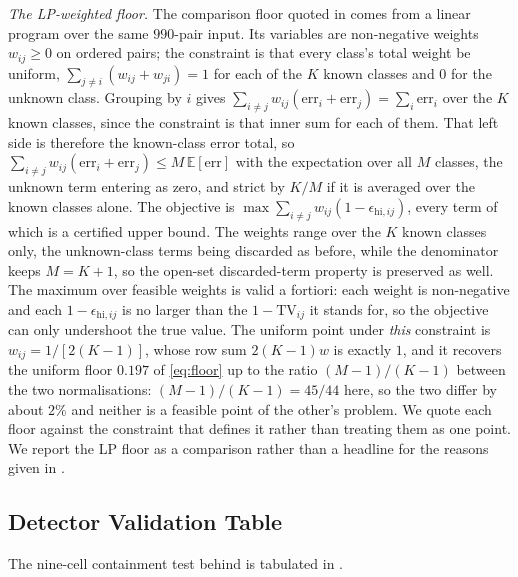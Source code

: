 \documentclass[sigconf,anonymous,review]{acmart}
\newcommand{\tv}{\mathrm{TV}}
\begin{document}
\emph{The LP-weighted floor.} The comparison floor quoted in
 comes from a linear program over the same $990$-pair
input. Its variables are non-negative weights $w_{ij}\ge 0$ on ordered pairs;
the constraint is that every class's total weight be uniform,
$\sum_{j\ne i}(w_{ij}+w_{ji})=1$ for each of the $K$ known classes and $0$ for
the unknown class. Grouping by $i$ gives
$\sum_{i\ne j}w_{ij}(\mathrm{err}_i+\mathrm{err}_j)=\sum_i \mathrm{err}_i$ over the
$K$ known classes, since the constraint is that inner sum for each of them. That
left side is therefore the known-class error total, so
$\sum_{i\ne j}w_{ij}(\mathrm{err}_i+\mathrm{err}_j)\le M\,\mathbb{E}[\mathrm{err}]$
with the expectation over all $M$ classes, the unknown term entering as zero,
and strict by $K/M$ if it is averaged over the known classes alone. The objective is
$\max\sum_{i\ne j}w_{ij}(1-\epsilon_{\mathrm{hi},ij})$, every term of
which is a certified upper bound. The weights range over the $K$ known classes
only, the unknown-class terms being discarded as before, while the denominator
keeps $M = K+1$, so the open-set discarded-term property is preserved as well. The
maximum over feasible weights is valid a fortiori: each weight is non-negative
and each $1-\epsilon_{\mathrm{hi},ij}$ is no larger than the $1-\tv_{ij}$ it stands for,
so the objective can only undershoot the true value. The uniform point under
\emph{this} constraint is $w_{ij}=1/[2(K-1)]$, whose row sum $2(K-1)w$ is exactly
$1$, and it recovers the uniform floor $0.197$ of \eqref{eq:floor} up to the
ratio $(M-1)/(K-1)$ between the two normalisations: $(M-1)/(K-1)=45/44$ here, so
the two differ by about $2\%$ and neither is a feasible point of the other's
problem. We quote each floor against the constraint that defines it rather than
treating them as one point. We report the LP floor as a comparison rather than a
headline for the reasons given in .


\subsection{Detector Validation Table}
\label{sec:appendix/detector_validation}

The nine-cell containment test behind  is tabulated in .
\end{document}
